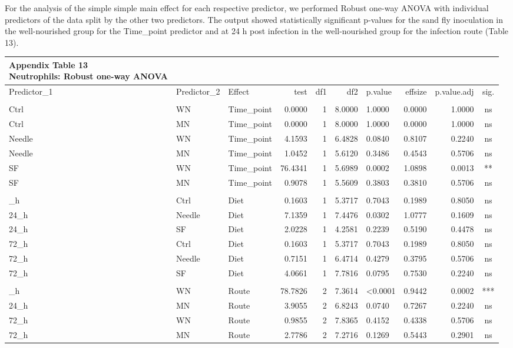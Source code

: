\documentclass[
  12pt,
  letterpaper,
]{article}
\begin{document}
For the analysis of the simple simple main effect for each respective predictor, we performed Robust one-way ANOVA with individual predictors of the data split by the other two predictors. The output showed statistically significant p-values for the sand fly inoculation in the well-nourished group for the Time\_point predictor and at 24 h post infection in the well-nourished group for the infection route (Table 13).

\begin{longtable}{lllrrrlrrc}
\caption*{
{\large \textbf{Appendix Table 13}} \\ 
{\small \textbf{Neutrophils: Robust one-way ANOVA}}
} \\ 
\toprule
Predictor\_1 & Predictor\_2 & Effect & test & df1 & df2 & p.value & effsize & p.value.adj & sig. \\ 
\midrule\addlinespace[2.5pt]
\multicolumn{10}{l}{Predictor: Time\_point} \\ 
\midrule\addlinespace[2.5pt]
Ctrl & WN & Time\_point & 0.0000 & 1 & 8.0000 & 1.0000 & 0.0000 & 1.0000 & ns \\ 
Ctrl & MN & Time\_point & 0.0000 & 1 & 8.0000 & 1.0000 & 0.0000 & 1.0000 & ns \\ 
Needle & WN & Time\_point & 4.1593 & 1 & 6.4828 & 0.0840 & 0.8107 & 0.2240 & ns \\ 
Needle & MN & Time\_point & 1.0452 & 1 & 5.6120 & 0.3486 & 0.4543 & 0.5706 & ns \\ 
SF & WN & Time\_point & 76.4341 & 1 & 5.6989 & 0.0002 & 1.0898 & 0.0013 & ** \\ 
SF & MN & Time\_point & 0.9078 & 1 & 5.5609 & 0.3803 & 0.3810 & 0.5706 & ns \\ 
\midrule\addlinespace[2.5pt]
\multicolumn{10}{l}{Predictor: Diet} \\ 
\midrule\addlinespace[2.5pt]
24\_h & Ctrl & Diet & 0.1603 & 1 & 5.3717 & 0.7043 & 0.1989 & 0.8050 & ns \\ 
24\_h & Needle & Diet & 7.1359 & 1 & 7.4476 & 0.0302 & 1.0777 & 0.1609 & ns \\ 
24\_h & SF & Diet & 2.0228 & 1 & 4.2581 & 0.2239 & 0.5190 & 0.4478 & ns \\ 
72\_h & Ctrl & Diet & 0.1603 & 1 & 5.3717 & 0.7043 & 0.1989 & 0.8050 & ns \\ 
72\_h & Needle & Diet & 0.7151 & 1 & 6.4714 & 0.4279 & 0.3795 & 0.5706 & ns \\ 
72\_h & SF & Diet & 4.0661 & 1 & 7.7816 & 0.0795 & 0.7530 & 0.2240 & ns \\ 
\midrule\addlinespace[2.5pt]
\multicolumn{10}{l}{Predictor: Route} \\ 
\midrule\addlinespace[2.5pt]
24\_h & WN & Route & 78.7826 & 2 & 7.3614 & <0.0001 & 0.9442 & 0.0002 & *** \\ 
24\_h & MN & Route & 3.9055 & 2 & 6.8243 & 0.0740 & 0.7267 & 0.2240 & ns \\ 
72\_h & WN & Route & 0.9855 & 2 & 7.8365 & 0.4152 & 0.4338 & 0.5706 & ns \\ 
72\_h & MN & Route & 2.7786 & 2 & 7.2716 & 0.1269 & 0.5443 & 0.2901 & ns \\ 
\bottomrule
\end{longtable}
\end{document}
